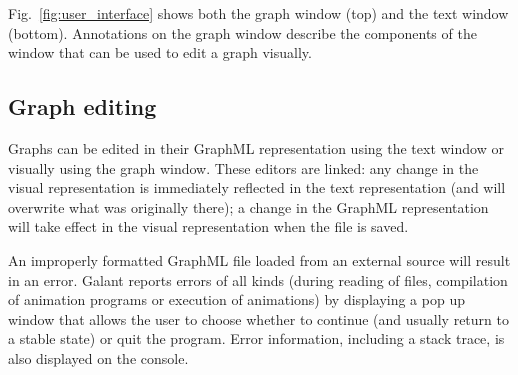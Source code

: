 Fig.~\ref{fig:user_interface} shows both the graph window (top) and the text
window (bottom). Annotations on the graph window describe the components of
the window that can be used to edit a graph visually.

\subsection{Graph editing}
\label{sec:graph_editing}

Graphs can be edited in their GraphML representation using the text window
or visually using the graph window.
These editors are linked:
any change in the visual representation is immediately reflected in the text
representation (and will overwrite what was originally there);
a change in the GraphML representation will take effect in the visual representation
when the file is saved.

An improperly formatted GraphML file loaded from an external source will
result in an error.
Galant reports errors of all kinds (during reading of files, compilation of
animation programs or execution of animations)
by displaying a pop up window that allows the user to choose whether to
continue (and usually return to a stable state) or quit the program.
Error information, including a stack trace, is also displayed on the console.

